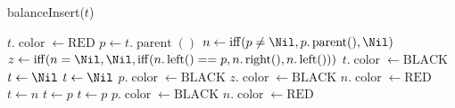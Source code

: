                    \begin{algorithm}
                        \caption{balanceInsert(\Tree $ t $)}
                        \begin{algorithmic}
                            \State $ t.\operatorname{color} \gets \text{RED} $
                                \State \Tree $ p \gets t.\operatorname{parent}()$
                                \State \Tree $ n \gets \operatorname{iff}(p \neq \Nil, p.\operatorname{parent}(), \Nil)$
                                \State \Tree $ z \gets \operatorname{iff}(n = \Nil, \Nil, \operatorname{iff}(n.\operatorname{left}() == p, n.\operatorname{right}(), n.\operatorname{left}()))$
                                 
                                    \State $ t.\operatorname{color} \gets \text{BLACK} $
                                    \State $ t \gets \Nil $
                                 
                                    \State $ t \gets \Nil $
                                 
                                    \State $ p.\operatorname{color} \gets \text{BLACK} $
                                    \State $ z.\operatorname{color} \gets \text{BLACK} $
                                    \State $ n.\operatorname{color} \gets \text{RED} $
                                    \State $ t \gets n $
                                \Else
                                     
                                        \State {}
                                        \State $ t \gets p $
                                     
                                        \State {}
                                        \State $ t \gets p $
                                    \Else
                                         
                                            \State {}
                                         
                                            \State {}
                                        \EndIf
                                        \State $ p.\operatorname{color} \gets \text{BLACK} $
                                        \State $ n.\operatorname{color} \gets \text{RED} $
                                    \EndIf
                                \EndIf
                            \EndWhile
                        \end{algorithmic}
                    \end{algorithm}
